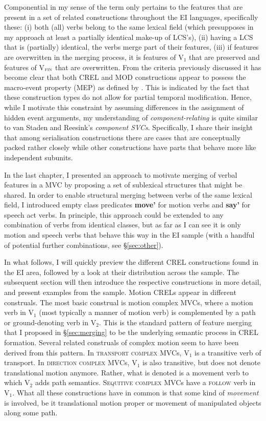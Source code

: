 Componential in my sense of the term only pertains to the features that are present in a set of related constructions throughout the EI languages, specifically these: (i) both (all) verbs belong to the same lexical field (which presupposes in my approach at least a partially identical make-up of LCS's), (ii) having a LCS that is (partially) identical, the verbs merge part of their features, (iii) if features are overwritten in the merging process, it is features of V$_{1}$ that are preserved and features of V$_{\textsc{fin}}$ that are overwritten. From the criteria previously discussed it has become clear that both CREL and MOD constructions appear to possess the macro-event property (MEP) as defined by \citet{bohnemeyer2007principles}. This is indicated by the fact that these construction types do not allow for partial temporal modification. Hence, while I motivate this constraint by assuming differences in the assignment of hidden event arguments, my understanding of \textit{component-relating} is quite similar to van Staden and Reesink's \textit{component SVCs}. Specifically, I share their insight that among serialisation constructions there are cases that are conceptually packed rather closely while other constructions have parts that behave more like independent subunits.

In the last chapter, I presented an approach to motivate merging of verbal features in a MVC by proposing a set of sublexical structures that might be shared. In order to enable structural merging between verbs of the same lexical field, I introduced empty class predicates \textbf{move'} for motion verbs and \textbf{say'} for speech act verbs. In principle, this approach could be extended to any combination of verbs from identical classes, but as far as I can see it is only motion and speech verbs that behave this way in the EI sample (with a handful of potential further combinations, see §\ref{sec:other}). 

In what follows, I will quickly preview the different CREL constructions found in the EI area, followed by a look at their distribution across the sample. The subsequent section will then introduce the respective constructions in more detail, and present examples from the sample. Motion CRELs appear in different construals. The most basic construal is motion complex MVCs, where a motion verb in V$_1$ (most typically a manner of motion verb) is complemented by a path or ground-denoting verb in V$_2$. This is the standard pattern of feature merging that I  proposed in §\ref{sec:merging} to be the underlying semantic process in CREL formation. Several related construals of complex motion seem to have been derived from this pattern. In \textsc{transport complex} MVCs, V$_1$ is a transitive verb of transport. In \textsc{direction complex} MVCs, V$_1$ is also transitive, but does not denote translational motion anymore. Rather, what is denoted is a movement verb to which V$_2$ adds path semantics. \textsc{Sequitive complex} MVCs have a \textsc{follow} verb in V$_1$. What all these constructions have in common is that some kind of \emph{movement} is involved, be it translational motion proper or movement of manipulated objects along some path.

